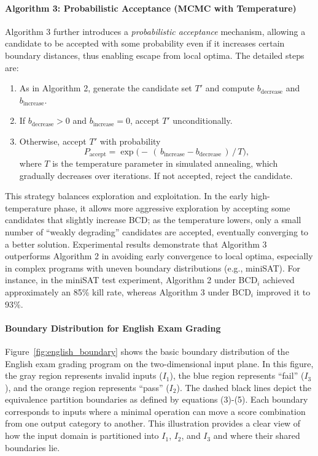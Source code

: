 \documentclass[manuscript,screen,review]{acmart}
\begin{document}
\paragraph{Algorithm 3: Probabilistic Acceptance (MCMC with Temperature)}  
Algorithm 3 further introduces a \emph{probabilistic acceptance} mechanism, allowing a candidate to be accepted with some probability even if it increases certain boundary distances, thus enabling escape from local optima. The detailed steps are:
\begin{enumerate}
  \item As in Algorithm 2, generate the candidate set $T'$ and compute $b_{\mathrm{decrease}}$ and $b_{\mathrm{increase}}$.
  \item If $b_{\mathrm{decrease}} > 0$ and $b_{\mathrm{increase}} = 0$, accept $T'$ unconditionally.
  \item Otherwise, accept $T'$ with probability
  \[
    P_{\mathrm{accept}} = \exp\bigl( -\, (\,b_{\mathrm{increase}} - b_{\mathrm{decrease}}\,)\,/\,T \bigr),
  \]
  where $T$ is the temperature parameter in simulated annealing, which gradually decreases over iterations. If not accepted, reject the candidate.
\end{enumerate}
This strategy balances exploration and exploitation. In the early high-temperature phase, it allows more aggressive exploration by accepting some candidates that slightly increase BCD; as the temperature lowers, only a small number of ``weakly degrading'' candidates are accepted, eventually converging to a better solution. Experimental results demonstrate that Algorithm 3 outperforms Algorithm 2 in avoiding early convergence to local optima, especially in complex programs with uneven boundary distributions (e.g., miniSAT). For instance, in the miniSAT test experiment, Algorithm 2 under BCD$_{i}$ achieved approximately an 85\% kill rate, whereas Algorithm 3 under BCD$_{i}$ improved it to 93\%.

\paragraph{Boundary Distribution for English Exam Grading}  
Figure~\ref{fig:english_boundary} shows the basic boundary distribution of the English exam grading program on the two-dimensional input plane. In this figure, the gray region represents invalid inputs ($I_1$), the blue region represents ``fail'' ($I_3$), and the orange region represents ``pass'' ($I_2$). The dashed black lines depict the equivalence partition boundaries as defined by equations (3)-(5). Each boundary corresponds to inputs where a minimal operation can move a score combination from one output category to another. This illustration provides a clear view of how the input domain is partitioned into $I_1$, $I_2$, and $I_3$ and where their shared boundaries lie.
\end{document}
